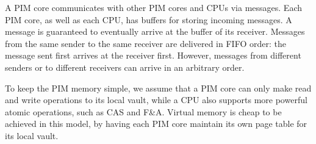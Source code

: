 A PIM core communicates with other PIM cores and CPUs via messages.
Each PIM core, as well as each CPU, has buffers for storing incoming messages.
A message is guaranteed to eventually arrive at the buffer of its receiver.
Messages from the same sender to the same receiver are delivered in FIFO order: 
the message sent first arrives at the receiver first. 
However, messages from different senders or to different receivers can arrive in an arbitrary order. 

To keep the PIM memory simple, we assume that a PIM core can only make read and write operations 
to its local vault, while a CPU also supports more powerful atomic operations, such as CAS and F\&A.
Virtual memory is cheap to be achieved in this model, 
by having each PIM core maintain its own page table for its local vault.